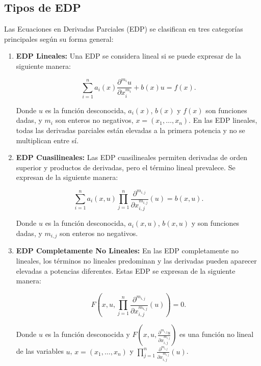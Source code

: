 \documentclass[11pt]{book}
\theoremstyle{plain}
\theoremstyle{definition}
\begin{document}
\subsection*{Tipos de EDP}

Las Ecuaciones en Derivadas Parciales (EDP) se clasifican en tres categorías principales según su forma general:

\begin{enumerate}
    \item \textbf{EDP Lineales:} Una EDP se considera lineal si se puede expresar de la siguiente manera:
    
    \begin{equation}
    \sum_{i=1}^{n} a_i(x) \frac{\partial^{m_i} u}{\partial x_i^{m_i}} + b(x)u = f(x).
    \end{equation}
    
    Donde $u$ es la función desconocida, $a_i(x)$, $b(x)$ y $f(x)$ son funciones dadas, y $m_i$ son enteros no negativos, $x  = (x_{1} , \ldots , x_{n})$. En las EDP lineales, todas las derivadas parciales están elevadas a la primera potencia y no se multiplican entre sí.
    
    \item \textbf{EDP Cuasilineales:} Las EDP cuasilineales permiten derivadas de orden superior y productos de derivadas, pero el término lineal prevalece. Se expresan de la siguiente manera:
    
    \begin{equation}
    \sum_{i=1}^{n} a_i(x, u) \prod_{j=1}^{n}\frac{\partial^{m_{i,j}}}{\partial x_{i,j}^{m_{i,j}}}(u) = b(x, u).
    \end{equation}
    
    Donde $u$ es la función desconocida, $a_i(x, u)$, $b(x, u)$ y son funciones dadas, y $m_{i,j}$ son enteros no negativos.
    
    \item \textbf{EDP Completamente No Lineales:} En las EDP completamente no lineales, los términos no lineales predominan y las derivadas pueden aparecer elevadas a potencias diferentes. Estas EDP se expresan de la siguiente manera:
    
    \begin{equation}
    F(x, u, \prod_{j=1}^{n}\frac{\partial^{m_{i,j}}}{\partial x_{i,j}^{m_{i,j}}}(u)) = 0.
    \end{equation}
    
    Donde $u$ es la función desconocida y $F(x, u, \frac{\partial^{m_{i,j}} u}{\partial x_{i,j}^{m_{i,j}}})$ es una función no lineal de las variables $u$, $x  = (x_{1} , \ldots , x_{n})$ y $\prod_{j=1}^{n}\frac{\partial^{m_{i,j}}}{\partial x_{i,j}^{m_{i,j}}}(u)$.
\end{enumerate}
\end{document}
